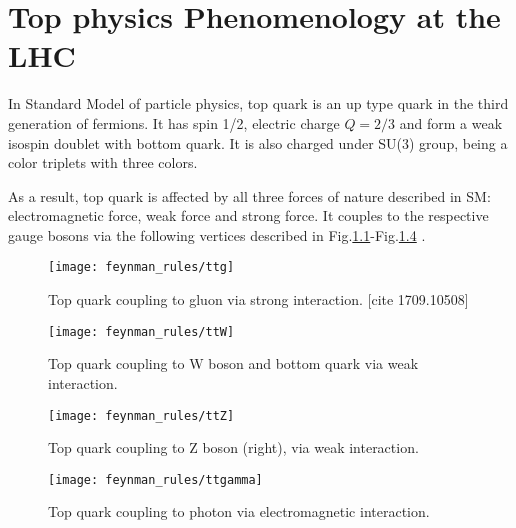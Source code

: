 \chapter{Top physics Phenomenology at the LHC}
\label{sec:phenomenology}

In Standard Model of particle physics, top quark is an up type quark in the third generation of fermions. It has spin 1/2, electric charge $Q=2/3$ and form a weak isospin doublet with bottom quark. It is also charged under SU(3) group, being a color triplets with three colors. 

As a result, top quark is affected by all three forces of nature described in SM: electromagnetic force, weak force and strong force. It couples to the respective gauge bosons via the following vertices described in Fig.\ref{fig:ttg}-Fig.\ref{fig:ttgamma} .

\begin{figure}[hbt]
  \begin{center}
    \texttt{[image: feynman\_rules/ttg]}
  \caption{\small Top quark coupling to gluon via strong interaction.  [cite 1709.10508] }
    \label{fig:ttg}
  \end{center}
\end{figure}

\begin{figure}[hbt]
  \begin{center}
    \texttt{[image: feynman\_rules/ttW]}
  \caption{\small Top quark coupling to W boson and bottom quark via weak interaction.}
    \label{fig:ttW}
  \end{center}
\end{figure}

\begin{figure}[hbt]
  \begin{center}
    \texttt{[image: feynman\_rules/ttZ]}
  \caption{\small Top quark coupling to Z boson (right), via weak interaction.}
    \label{fig:ttZ}
  \end{center}
\end{figure}


\begin{figure}[hbt]
  \begin{center}
    \texttt{[image: feynman\_rules/ttgamma]}
  \caption{\small Top quark coupling to photon via electromagnetic interaction.}
    \label{fig:ttgamma}
  \end{center}
\end{figure}

